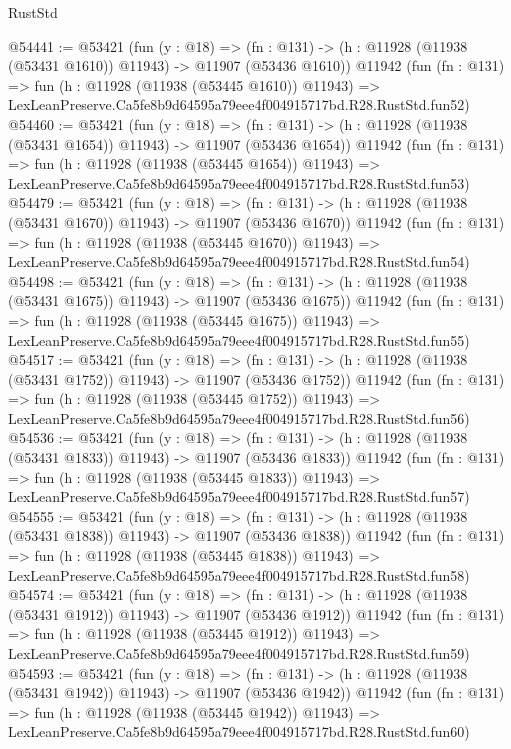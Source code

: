 \begin{lexlean}{RustStd}
\begin{coremodule}
@54441 := @53421
    (fun (y : @18) =>
    (fn : @131) -> (h : @11928 (@11938 (@53431 @1610)) @11943) -> @11907 (@53436 @1610))
    @11942
    (fun (fn : @131) =>
    fun (h : @11928 (@11938 (@53445 @1610)) @11943) =>
    LexLeanPreserve.Ca5fe8b9d64595a79eee4f004915717bd.R28.RustStd.fun52)
@54460 := @53421
    (fun (y : @18) =>
    (fn : @131) -> (h : @11928 (@11938 (@53431 @1654)) @11943) -> @11907 (@53436 @1654))
    @11942
    (fun (fn : @131) =>
    fun (h : @11928 (@11938 (@53445 @1654)) @11943) =>
    LexLeanPreserve.Ca5fe8b9d64595a79eee4f004915717bd.R28.RustStd.fun53)
@54479 := @53421
    (fun (y : @18) =>
    (fn : @131) -> (h : @11928 (@11938 (@53431 @1670)) @11943) -> @11907 (@53436 @1670))
    @11942
    (fun (fn : @131) =>
    fun (h : @11928 (@11938 (@53445 @1670)) @11943) =>
    LexLeanPreserve.Ca5fe8b9d64595a79eee4f004915717bd.R28.RustStd.fun54)
@54498 := @53421
    (fun (y : @18) =>
    (fn : @131) -> (h : @11928 (@11938 (@53431 @1675)) @11943) -> @11907 (@53436 @1675))
    @11942
    (fun (fn : @131) =>
    fun (h : @11928 (@11938 (@53445 @1675)) @11943) =>
    LexLeanPreserve.Ca5fe8b9d64595a79eee4f004915717bd.R28.RustStd.fun55)
@54517 := @53421
    (fun (y : @18) =>
    (fn : @131) -> (h : @11928 (@11938 (@53431 @1752)) @11943) -> @11907 (@53436 @1752))
    @11942
    (fun (fn : @131) =>
    fun (h : @11928 (@11938 (@53445 @1752)) @11943) =>
    LexLeanPreserve.Ca5fe8b9d64595a79eee4f004915717bd.R28.RustStd.fun56)
@54536 := @53421
    (fun (y : @18) =>
    (fn : @131) -> (h : @11928 (@11938 (@53431 @1833)) @11943) -> @11907 (@53436 @1833))
    @11942
    (fun (fn : @131) =>
    fun (h : @11928 (@11938 (@53445 @1833)) @11943) =>
    LexLeanPreserve.Ca5fe8b9d64595a79eee4f004915717bd.R28.RustStd.fun57)
@54555 := @53421
    (fun (y : @18) =>
    (fn : @131) -> (h : @11928 (@11938 (@53431 @1838)) @11943) -> @11907 (@53436 @1838))
    @11942
    (fun (fn : @131) =>
    fun (h : @11928 (@11938 (@53445 @1838)) @11943) =>
    LexLeanPreserve.Ca5fe8b9d64595a79eee4f004915717bd.R28.RustStd.fun58)
@54574 := @53421
    (fun (y : @18) =>
    (fn : @131) -> (h : @11928 (@11938 (@53431 @1912)) @11943) -> @11907 (@53436 @1912))
    @11942
    (fun (fn : @131) =>
    fun (h : @11928 (@11938 (@53445 @1912)) @11943) =>
    LexLeanPreserve.Ca5fe8b9d64595a79eee4f004915717bd.R28.RustStd.fun59)
@54593 := @53421
    (fun (y : @18) =>
    (fn : @131) -> (h : @11928 (@11938 (@53431 @1942)) @11943) -> @11907 (@53436 @1942))
    @11942
    (fun (fn : @131) =>
    fun (h : @11928 (@11938 (@53445 @1942)) @11943) =>
    LexLeanPreserve.Ca5fe8b9d64595a79eee4f004915717bd.R28.RustStd.fun60)

\end{coremodule}
\end{lexlean}
